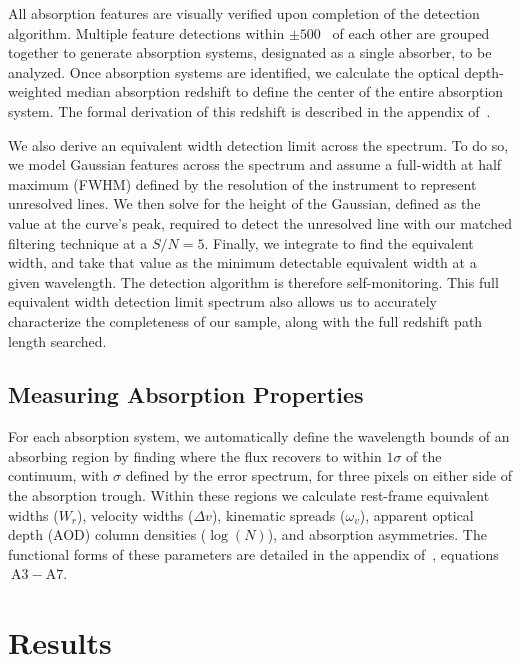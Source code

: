 \documentclass[iop,apj,numberedappendix,appendixfloats,twocolappendix]{emulateapj}
\begin{document}
All absorption features are visually verified upon completion of the detection algorithm. Multiple feature detections within $\pm 500$~{\kms} of each other are grouped together to generate absorption systems, designated as a single absorber, to be analyzed. Once absorption systems are identified, we calculate the optical depth-weighted median absorption redshift to define the center of the entire absorption system. The formal derivation of this redshift is described in the appendix of~\cite{Churchill2001}.

We also derive an equivalent width detection limit across the spectrum. To do so, we model Gaussian features across the spectrum and assume a full-width at half maximum (FWHM) defined by the resolution of the instrument to represent unresolved lines. We then solve for the height of the Gaussian, defined as the value at the curve's peak, required to detect the unresolved line with our matched filtering technique at a $S/N = 5$. Finally, we integrate to find the equivalent width, and take that value as the minimum detectable equivalent width at a given wavelength. The detection algorithm is therefore self-monitoring. This full equivalent width detection limit spectrum also allows us to accurately characterize the completeness of our sample, along with the full redshift path length searched.  


\subsection{Measuring Absorption Properties}
\label{sec:measuring}

For each absorption system, we automatically define the wavelength bounds of an absorbing region by finding where the flux recovers to within $1\sigma$ of the continuum, with $\sigma$ defined by the error spectrum, for three pixels on either side of the absorption trough. Within these regions we calculate rest-frame equivalent widths ($W_r$), velocity widths ($\Delta v$), kinematic spreads ($\omega_v$), apparent optical depth (AOD) column densities ($\log(N)$), and absorption asymmetries. The functional forms of these parameters are detailed in the appendix of~\cite{Churchill2001}, equations$~\mathrm{A3 - A7}$.


\section{Results}
\label{sec:results}
\end{document}
